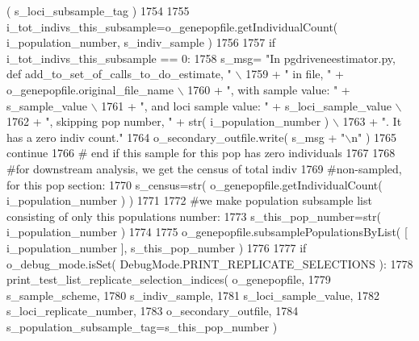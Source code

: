 \begin{DoxyCode}
      ( s\_loci\_subsample\_tag )
1754 
1755                 i\_tot\_indivs\_this\_subsample=o\_genepopfile.getIndividualCount( i\_population\_number, 
      s\_indiv\_sample )
1756 
1757                 \textcolor{keywordflow}{if} i\_tot\_indivs\_this\_subsample == 0:
1758                     s\_msg= \textcolor{stringliteral}{"In pgdriveneestimator.py, def add\_to\_set\_of\_calls\_to\_do\_estimate, "} \(\backslash\)
1759                                     + \textcolor{stringliteral}{" in file, "} + o\_genepopfile.original\_file\_name \(\backslash\)
1760                                     + \textcolor{stringliteral}{", with sample value: "} + s\_sample\_value \(\backslash\)
1761                                     + \textcolor{stringliteral}{", and loci sample value: "} + s\_loci\_sample\_value \(\backslash\)
1762                                     + \textcolor{stringliteral}{", skipping pop number, "}  + str( i\_population\_number ) \(\backslash\)
1763                                     + \textcolor{stringliteral}{".  It has a zero indiv count."}
1764                     o\_secondary\_outfile.write( s\_msg + \textcolor{stringliteral}{"\(\backslash\)n"} )
1765                     \textcolor{keywordflow}{continue}
1766                 \textcolor{comment}{# end if this sample for this pop has zero individuals}
1767 
1768                 \textcolor{comment}{#for downstream analysis, we get the census of total indiv}
1769                 \textcolor{comment}{#non-sampled, for this pop section:}
1770                 s\_census=str( o\_genepopfile.getIndividualCount( i\_population\_number ) )
1771 
1772                 \textcolor{comment}{#we make population subsample list consisting of only this populations number:}
1773                 s\_this\_pop\_number=str( i\_population\_number ) 
1774 
1775                 o\_genepopfile.subsamplePopulationsByList( [ i\_population\_number ], s\_this\_pop\_number )
1776 
1777                 \textcolor{keywordflow}{if} o\_debug\_mode.isSet( DebugMode.PRINT\_REPLICATE\_SELECTIONS ):
1778                     print\_test\_list\_replicate\_selection\_indices( o\_genepopfile, 
1779                                             s\_sample\_scheme,    
1780                                             s\_indiv\_sample, 
1781                                             s\_loci\_sample\_value,
1782                                             s\_loci\_replicate\_number,
1783                                             o\_secondary\_outfile, 
1784                                             s\_population\_subsample\_tag=s\_this\_pop\_number )

\end{DoxyCode}
